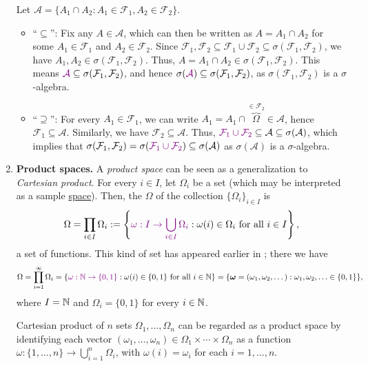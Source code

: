 \begin{enumerate}
\begin{pf}
Let \(\mathcal{A}=\{A_1\cap A_2:A_1\in\mathcal{F}_1, A_2\in \mathcal{F}_2\}\).
\begin{itemize}
\item ``\(\subseteq\)'': Fix any \(A\in \mathcal{A}\), which can then be
written as \(A=A_1\cap A_2\) for some \(A_1\in\mathcal{F}_1\) and \(A_2\in
\mathcal{F}_2\).  Since \(\mathcal{F}_1,\mathcal{F}_2\subseteq
\mathcal{F}_1\cup\mathcal{F}_2\subseteq \sigma(\mathcal{F}_1,\mathcal{F}_2)\),
we have \(A_1,A_2\in\sigma(\mathcal{F}_1,\mathcal{F}_2)\). Thus, \(A=A_1\cap
A_2\in \sigma(\mathcal{F}_1,\mathcal{F}_2)\). This means
\({\color{violet}\mathcal{A}}\subseteq \sigma(\mathcal{F}_1,\mathcal{F}_2)\), and hence
\(\sigma({\color{violet}\mathcal{A}})\subseteq \sigma(\mathcal{F}_1,\mathcal{F}_2)\), as
\(\sigma(\mathcal{F}_1,\mathcal{F}_2)\) is a \(\sigma\)-algebra.
\item ``\(\supseteq\)'': For every \(A_1\in\mathcal{F}_1\), we can write
\(A_1=A_1\cap\overbrace{\Omega}^{\in\mathcal{F}_2}\in\mathcal{A}\), hence
\(\mathcal{F}_1\subseteq \mathcal{A}\). Similarly, we have
\(\mathcal{F}_2\subseteq \mathcal{A}\).  Thus,
\({\color{violet}\mathcal{F}_1\cup\mathcal{F}_2}\subseteq \mathcal{A}\subseteq
\sigma(\mathcal{A})\), which implies that
\(\sigma(\mathcal{F}_1,\mathcal{F}_2)=\sigma({\color{violet}\mathcal{F}_1\cup
\mathcal{F}_2})\subseteq \sigma(\mathcal{A})\) as \(\sigma(\mathcal{A})\) is a
\(\sigma\)-algebra.
\end{itemize}
\end{pf}
\item \textbf{Product spaces.} A \emph{product space} can be seen as a
generalization to \emph{Cartesian product}. For every \(i\in I\), let
\(\Omega_i\) be a set (which may be interpreted as a sample \underline{space}).
Then, the  \(\Omega\) of the collection
\(\{\Omega_i\}_{i\in I}\) is
\[
\Omega=\prod_{i\in I}\Omega_i:=\left\{{\color{violet}\omega: I\to\bigcup_{i\in I}^{}\Omega_i}
:\omega(i)\in \Omega_i\text{ for all \(i\in I\)}\right\},
\]
a set of functions. This kind of set has appeared earlier in ;
there we have
\[
\Omega=\prod_{i=1}^{\infty}\Omega_i
=\{{\color{violet}\omega: \mathbb{N}\to\{0,1\}}:\omega(i)\in\{0,1\}\text{ for all \(i\in\mathbb{N}\)}\}
=\{\bm{\omega}=(\omega_1,\omega_2,\dotsc):\omega_1,\omega_2,\dotsc\in\{0,1\}\},
\]
where \(I=\mathbb{N}\) and \(\Omega_i=\{0,1\}\) for every \(i\in\mathbb{N}\).
\begin{note}
Cartesian product of \(n\) sets \(\Omega_1,\dotsc,\Omega_n\) can be regarded as
a product space by identifying each vector
\((\omega_1,\dotsc,\omega_n)\in\Omega_1\times \dotsb\times \Omega_n\) as a
function \(\omega:\{1,\dotsc,n\}\to\bigcup_{i=1}^{n}\Omega_i\), with
\(\omega(i)=\omega_i\) for each \(i=1,\dotsc,n\).
\end{note}


\end{enumerate}
